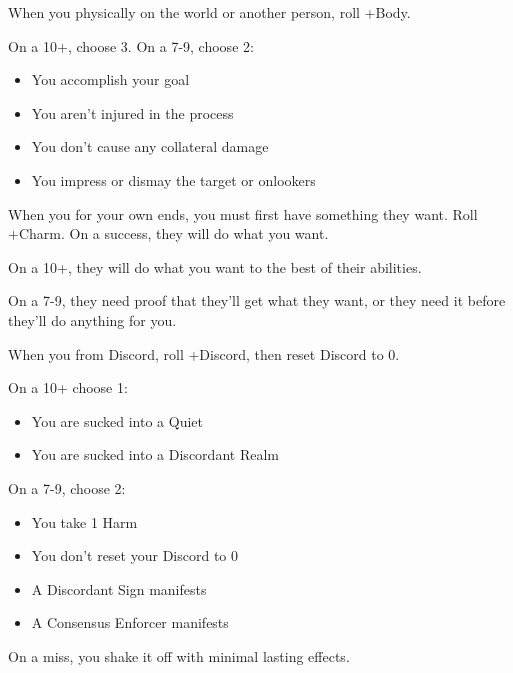 \begin{multicols}{3}
  \columnbreak
  
  \begin{move}
    When you  physically on the world or another
    person, roll +Body.

    On a 10+, choose 3. On a 7-9, choose 2:
    \begin{itemize}
      \setlength\itemsep{0em}
    \item You accomplish your goal
    \item You aren't injured in the process
    \item You don't cause any collateral damage
    \item You impress or dismay the target or onlookers
    \end{itemize}
  \end{move}

  \SEPARATOR

  \begin{move}
    When you  for your own ends, you must first
    have something they want. Roll +Charm. On a success, they will do
    what you want.

    On a 10+, they will do what you want to the best of their
    abilities.

    On a 7-9, they need proof that they'll get what they want, or they
    need it before they'll do anything for you.
  \end{move}

  \SEPARATOR

  \begin{move}
    When you  from Discord, roll +Discord, then reset
    Discord to 0.

    On a 10+ choose 1:
    \begin{itemize}
      \setlength\itemsep{0em}
    \item You are sucked into a Quiet
    \item You are sucked into a Discordant Realm
    \end{itemize}

    On a 7-9, choose 2:
    \begin{itemize}
      \setlength\itemsep{0em}
    \item You take 1 Harm
    \item You don't reset your Discord to 0
    \item A Discordant Sign manifests
    \item A Consensus Enforcer manifests
    \end{itemize}

    On a miss, you shake it off with minimal lasting effects.
  \end{move}

\end{multicols}

